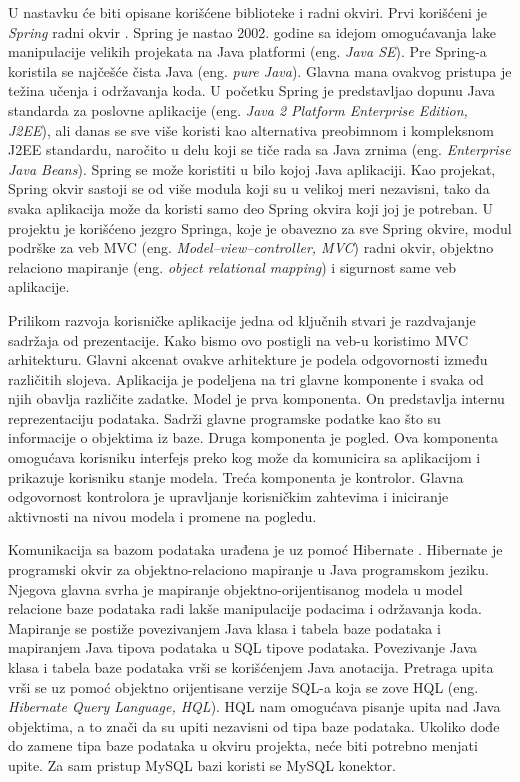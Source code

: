 \documentclass[12pt,oneside]{memoir}
\begin{document}
U nastavku će biti opisane korišćene biblioteke i radni okviri. Prvi korišćeni je \textit{Spring} radni okvir \cite{Spring}.
Spring je nastao 2002. godine sa idejom omogućavanja lake manipulacije velikih projekata na Java platformi (eng. \textit{Java SE}). Pre Spring-a koristila se najčešće čista Java (eng. \textit{pure Java}). Glavna mana ovakvog pristupa je težina učenja i održavanja koda. U početku Spring je predstavljao dopunu Java standarda za poslovne aplikacije (eng. \textit{Java 2 Platform Enterprise Edition, J2EE}), ali danas se sve više koristi kao alternativa preobimnom i kompleksnom J2EE standardu, naročito u delu koji se tiče rada sa Java zrnima (eng. \textit{Enterprise Java Beans}). Spring se može koristiti u bilo kojoj Java aplikaciji. Kao projekat, Spring okvir sastoji se od više modula koji su u velikoj meri nezavisni, tako da svaka aplikacija može da koristi samo deo Spring okvira koji joj je potreban. U projektu je korišćeno jezgro Springa, koje je obavezno za sve Spring okvire, modul podrške za veb MVC (eng. \textit{Model–view–controller, MVC}) radni okvir, objektno relaciono mapiranje (eng. \textit{object relational mapping}) i sigurnost same veb aplikacije.

Prilikom razvoja korisničke aplikacije jedna od ključnih stvari je razdvajanje sadržaja od prezentacije. Kako bismo ovo postigli na veb-u koristimo MVC arhitekturu. Glavni akcenat ovakve arhitekture je podela odgovornosti između različitih slojeva. Aplikacija je podeljena na tri glavne komponente i svaka od njih obavlja različite zadatke. Model je prva komponenta. On predstavlja internu reprezentaciju podataka. Sadrži glavne programske podatke kao što su informacije o objektima iz baze. Druga komponenta je pogled. Ova komponenta omogućava korisniku interfejs preko kog može da komunicira sa aplikacijom i prikazuje korisniku stanje modela. Treća komponenta je kontrolor. Glavna odgovornost kontrolora je upravljanje korisničkim zahtevima i iniciranje aktivnosti na nivou modela i promene na pogledu. 

Komunikacija sa bazom podataka urađena je uz pomoć Hibernate \cite{Hibernate}. Hibernate je programski okvir za objektno-relaciono mapiranje u Java programskom jeziku. Njegova glavna svrha je mapiranje objektno-orijentisanog modela u model relacione baze podataka radi lakše manipulacije podacima i održavanja koda. Mapiranje se postiže povezivanjem Java klasa i tabela baze podataka i mapiranjem Java tipova podataka u SQL tipove podataka. Povezivanje Java klasa i tabela baze podataka vrši se korišćenjem Java anotacija. Pretraga upita vrši se uz pomoć objektno orijentisane verzije SQL-a koja se zove HQL (eng. \textit{Hibernate Query Language, HQL}). HQL nam omogućava pisanje upita nad Java objektima, a to znači da su upiti nezavisni od tipa baze podataka. Ukoliko dođe do zamene tipa baze podataka u okviru projekta, neće biti potrebno menjati upite. Za sam pristup MySQL bazi koristi se MySQL konektor. 
\end{document}
